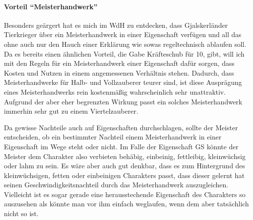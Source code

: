 \paragraph{Vorteil \enquote{Meisterhandwerk}}
Besonders geärgert hat es mich im WdH zu entdecken, dass Gjalskerländer Tierkrieger über ein Meisterhandwerk in einer Eigenschaft verfügen und all das ohne auch nur den Hauch einer Erklärung wie sowas regeltechnisch ablaufen soll. Da es bereits einen ähnlichen Vorteil, die Gabe Kräfteschub für \SI{10}{\GP}, gibt, will ich mit den Regeln für ein Meisterhandwerk einer Eigenschaft dafür sorgen, dass Kosten und Nutzen in einem angemessenen Verhältnis stehen. Dadurch, dass Meisterhandwerke für Halb- und Vollzauberer teurer sind, ist diese Ausprägung eines Meisterhandwerks rein kostenmäßig wahrscheinlich sehr unattraktiv. Aufgrund der aber eher begrenzten Wirkung passt ein solches Meisterhandwerk immerhin sehr gut zu einem Viertelzauberer.

Da gewisse Nachteile auch auf Eigenschaften durchschlagen, sollte der Meister entscheiden, ob ein bestimmter Nachteil einem Meisterhandwerk in einer Eigenschaft im Wege steht oder nicht. Im Falle der Eigenschaft GS könnte der Meister dem Charakter also verbieten behäbig, einbeinig, fettleibig, kleinwüchsig oder lahm zu sein. Es wäre aber auch gut denkbar, dass es zum Hintergrund des kleinwüchsigen, fetten oder einbeinigen Charakters passt, dass dieser gelernt hat seinen Geschwindigkeitsnachteil durch das Meisterhandwerk auszugleichen. Vielleicht ist es sogar gerade eine herausstechende Eigenschaft des Charakters so auszusehen als könnte man vor ihm einfach weglaufen, wenn dem aber tatsächlich nicht so ist.
